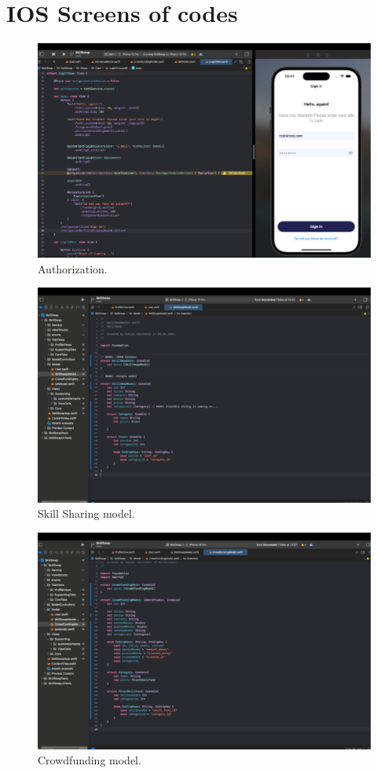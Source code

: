 \section{IOS Screens of codes}
\begin{figure}[H]\label{fig:authorization}
  \centering
  \includegraphics[width=0.8\linewidth]{figures/Authorization.png}
  \caption{Authorization.}
\end{figure}
\begin{figure}[H]\label{fig:skillsharingmodel}
  \centering
  \includegraphics[width=0.8\linewidth]{figures/Skill Sharing model.png}
  \caption{Skill Sharing model.}
\end{figure}
\begin{figure}[H]\label{fig:crowdfundingmodel}
  \centering
  \includegraphics[width=0.8\linewidth]{figures/Crowdfunding model.png}
  \caption{Crowdfunding model.}
\end{figure}
